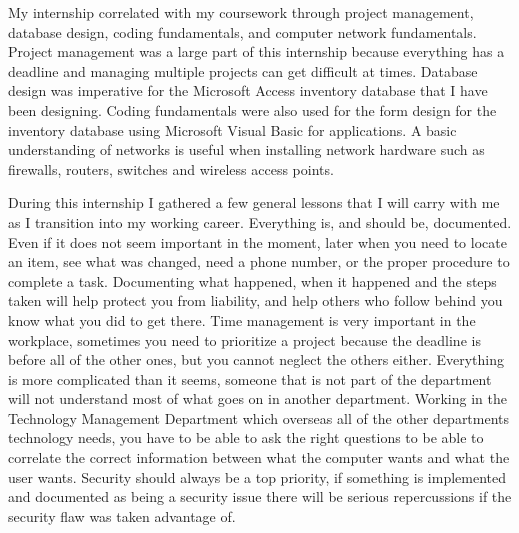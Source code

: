 \documentclass[12pt]{article}
\begin{document}
	My internship correlated with my coursework through project management, database design,
	coding fundamentals, and computer network fundamentals. Project management was a large
	part of this internship because everything has a deadline and managing multiple projects
	can get difficult at times. Database design was imperative for the Microsoft Access
	inventory database that I have been designing. Coding fundamentals were also used 
	for the form design for the inventory database using Microsoft Visual Basic for
	applications. A basic understanding of networks is useful when installing network hardware
	such as firewalls, routers, switches and wireless access points.

	During this internship I gathered a few general lessons that I will carry with me as I
	transition into my working career. Everything is, and should be, documented. Even if it
	does not seem important in the moment, later when you need to locate an item, see what
	was changed, need a phone number, or the proper procedure to complete a task. Documenting
	what happened, when it happened and the steps taken will help protect you from liability,
	and help others who follow behind you know what you did to get there. Time management
	is very important in the workplace, sometimes you need to prioritize a project because
	the deadline is before all of the other ones, but you cannot neglect the others either.
	Everything is more complicated than it seems, someone that is not part of the department
	will not understand most of what goes on in another department. Working in the Technology
	Management Department which overseas all of the other departments technology needs, you
	have to be able to ask the right questions to be able to correlate the correct information
	between what the computer wants and what the user wants. Security should always be a top
	priority, if something is implemented and documented as being a security issue there
	will be serious repercussions if the security flaw was taken advantage of.
\end{document}
